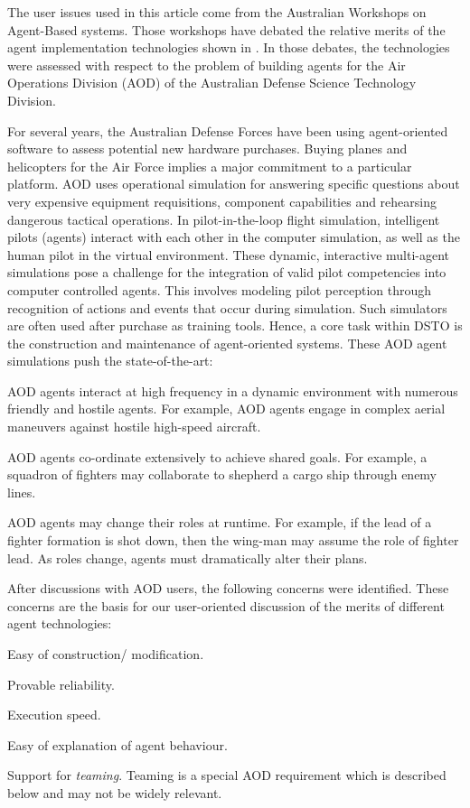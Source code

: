 The user issues used in this article come   from the Australian
Workshops on Agent-Based systems. Those workshops have debated the
relative merits of the agent implementation technologies shown in
. In those debates, the technologies were assessed with
respect to the problem of building agents for the  Air Operations
Division (AOD) of the Australian Defense Science Technology
Division.

For several years, the Australian Defense Forces have been using
agent-oriented software to assess potential new hardware
purchases.  Buying planes and helicopters for the Air Force
implies a major commitment to a particular platform.   AOD uses
operational simulation for answering specific questions about very
expensive equipment requisitions, component capabilities and
rehearsing dangerous tactical operations.   In pilot-in-the-loop
flight simulation, intelligent pilots (agents) interact with each
other in the computer simulation, as well as the human pilot in
the virtual environment. These dynamic, interactive multi-agent
simulations pose a challenge for the integration of valid pilot
competencies into computer controlled agents. This involves
modeling pilot perception through recognition of actions and
events that occur during simulation. Such simulators are often
used after purchase as training tools. Hence, a core task within
DSTO is the construction and maintenance of agent-oriented
systems. These AOD agent simulations push the state-of-the-art:
\bi \item AOD agents interact at high frequency in a dynamic
environment  with numerous friendly and hostile agents. For
example, AOD agents engage in complex aerial maneuvers against
hostile high-speed aircraft. \item AOD agents co-ordinate
extensively to achieve shared goals. For example, a squadron of
fighters may collaborate to shepherd a cargo ship through enemy
lines. \item AOD agents may change their roles at runtime. For
example, if the lead of a fighter formation is shot down, then the
wing-man may assume the role of fighter lead. As roles change,
agents must dramatically alter their plans. \ei

After discussions with AOD users, the following concerns were
identified. These concerns are the basis for our user-oriented
discussion  of the merits of different agent technologies:  \bi
\item Easy of construction/ modification. \item Provable
reliability. \item Execution speed. \item Easy of explanation of
agent behaviour. \item Support for {\em teaming}. Teaming is a
special AOD requirement which is described below and may not be
widely relevant. \ei


